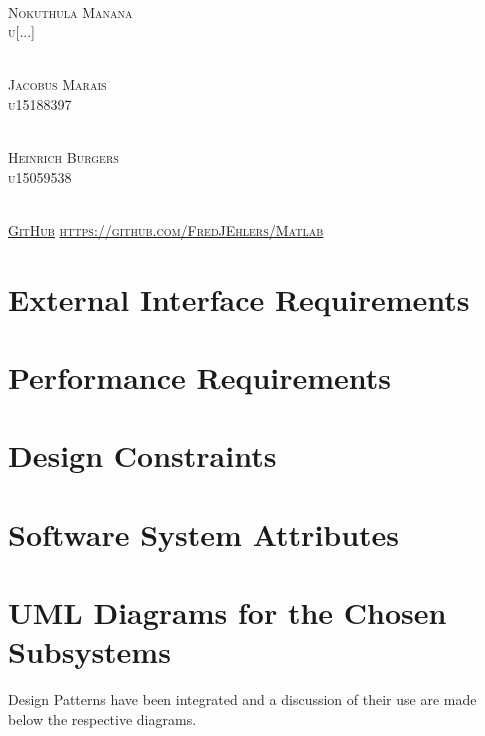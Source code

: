 \documentclass[runningheads,a4paper]{article}
\begin{document}
\begin{titlepage}
\begin{center}
\begin{multicols}{2}
				\textsc{\large\\
					 Nokuthula Manana\\
					u[...]\\
				}
				
				\textsc{\large\\
					Jacobus Marais\\
					u15188397\\
				}
				
				\textsc{\large\\
					Heinrich Burgers\\
					u15059538\\
				}
				
				
				
			\end{multicols}
			
			
			\textsc{	\\ \href{https://github.com/FredJEhlers/Matlab}{GitHub}
				\url{https://github.com/FredJEhlers/Matlab}}
			
		\end{center}
	\end{titlepage}

\begingroup

\tableofcontents
{}
\endgroup
\newpage


\section{External Interface Requirements}

\section{Performance Requirements}

\section{Design Constraints}

\section{Software System Attributes}

\section{UML Diagrams for the Chosen Subsystems}
Design Patterns have been integrated and a discussion of their use are made below the respective diagrams.
\end{document}
